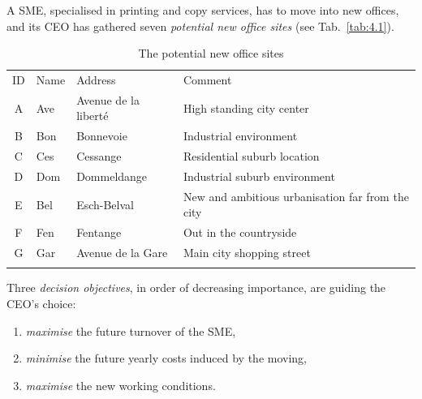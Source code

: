 A SME, specialised in printing and copy services, has to move into new offices, and its CEO has gathered seven \emph{potential new office sites} (see Tab.~\vref{tab:4.1}).
\begin{table}[ht]
\caption{The potential new office sites}
\label{tab:4.1}       %
\begin{center}
    \begin{tabular}{c|l|l|l}
      \svhline\noalign{\smallskip}
      ID & Name & Address & Comment\\
      \noalign{\smallskip}\hline\noalign{\smallskip}
    A &   Ave  &  Avenue de la liberté &  High standing city center\\
    B &   Bon  &  Bonnevoie &             Industrial environment\\
    C &   Ces  &  Cessange &              Residential suburb location\\
    D &   Dom  &  Dommeldange &           Industrial suburb environment\\
    E &   Bel  &  Esch-Belval &           New and ambitious urbanisation far from the city\\
    F &   Fen  &  Fentange &              Out in the countryside\\
      G &   Gar  &  Avenue de la Gare &     Main city shopping street\\
      \noalign{\smallskip}\hline
    \end{tabular}
\end{center}
\end{table}

Three \emph{decision objectives}, in order of decreasing importance, are guiding the CEO's choice:
\begin{enumerate}[leftmargin=1cm]
\item \emph{maximise} the future turnover of the SME,
\item \emph{minimise} the future yearly costs induced by the moving,
\item \emph{maximise} the new working conditions.
\end{enumerate}

